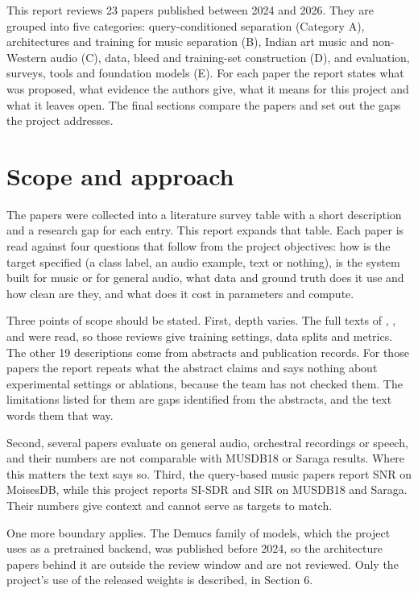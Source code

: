 \documentclass[12pt,a4paper]{article}
\begin{document}
This report reviews 23 papers published between 2024 and 2026. They are grouped into five categories: query-conditioned separation (Category A), architectures and training for music separation (B), Indian art music and non-Western audio (C), data, bleed and training-set construction (D), and evaluation, surveys, tools and foundation models (E). For each paper the report states what was proposed, what evidence the authors give, what it means for this project and what it leaves open. The final sections compare the papers and set out the gaps the project addresses.

\section{Scope and approach}

The papers were collected into a literature survey table with a short description and a research gap for each entry. This report expands that table. Each paper is read against four questions that follow from the project objectives: how is the target specified (a class label, an audio example, text or nothing), is the system built for music or for general audio, what data and ground truth does it use and how clean are they, and what does it cost in parameters and compute.

Three points of scope should be stated. First, depth varies. The full texts of \cite{banquet}, \cite{pmq}, \cite{sanidha} and \cite{ssn} were read, so those reviews give training settings, data splits and metrics. The other 19 descriptions come from abstracts and publication records. For those papers the report repeats what the abstract claims and says nothing about experimental settings or ablations, because the team has not checked them. The limitations listed for them are gaps identified from the abstracts, and the text words them that way.

Second, several papers evaluate on general audio, orchestral recordings or speech, and their numbers are not comparable with MUSDB18 or Saraga results. Where this matters the text says so. Third, the query-based music papers \cite{banquet,hyperell,qscnet} report SNR on MoisesDB, while this project reports SI-SDR and SIR on MUSDB18 and Saraga. Their numbers give context and cannot serve as targets to match.

One more boundary applies. The Demucs family of models, which the project uses as a pretrained backend, was published before 2024, so the architecture papers behind it are outside the review window and are not reviewed. Only the project's use of the released weights is described, in Section 6.
\end{document}

